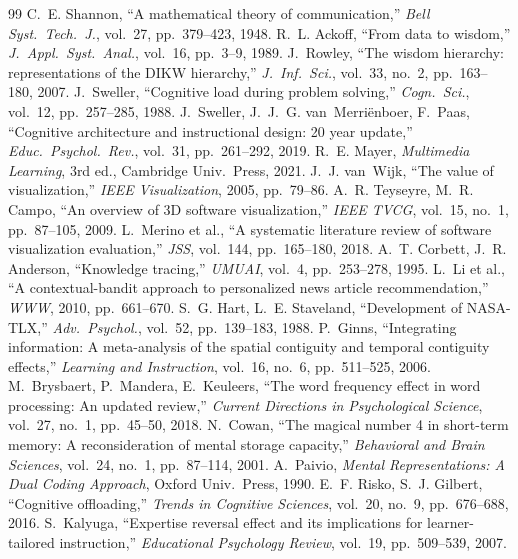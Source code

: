 \documentclass[10pt,a4paper]{article}
\begin{document}
\begin{thebibliography}{99}
\small
{} C.~E. Shannon, ``A mathematical theory of communication,'' \emph{Bell Syst.\ Tech.\ J.}, vol.~27, pp.~379--423, 1948.
 R.~L. Ackoff, ``From data to wisdom,'' \emph{J.\ Appl.\ Syst.\ Anal.}, vol.~16, pp.~3--9, 1989.
 J.~Rowley, ``The wisdom hierarchy: representations of the DIKW hierarchy,'' \emph{J.\ Inf.\ Sci.}, vol.~33, no.~2, pp.~163--180, 2007.
 J.~Sweller, ``Cognitive load during problem solving,'' \emph{Cogn.\ Sci.}, vol.~12, pp.~257--285, 1988.
 J.~Sweller, J.~J.~G. van~Merriënboer, F.~Paas, ``Cognitive architecture and instructional design: 20 year update,'' \emph{Educ.\ Psychol.\ Rev.}, vol.~31, pp.~261--292, 2019.
 R.~E. Mayer, \emph{Multimedia Learning}, 3rd ed., Cambridge Univ.\ Press, 2021.
 J.~J. van~Wijk, ``The value of visualization,'' \emph{IEEE Visualization}, 2005, pp.~79--86.
 A.~R. Teyseyre, M.~R. Campo, ``An overview of 3D software visualization,'' \emph{IEEE TVCG}, vol.~15, no.~1, pp.~87--105, 2009.
 L.~Merino et al., ``A systematic literature review of software visualization evaluation,'' \emph{JSS}, vol.~144, pp.~165--180, 2018.
 A.~T. Corbett, J.~R. Anderson, ``Knowledge tracing,'' \emph{UMUAI}, vol.~4, pp.~253--278, 1995.
 L.~Li et al., ``A contextual-bandit approach to personalized news article recommendation,'' \emph{WWW}, 2010, pp.~661--670.
 S.~G. Hart, L.~E. Staveland, ``Development of NASA-TLX,'' \emph{Adv.\ Psychol.}, vol.~52, pp.~139--183, 1988.
 P.~Ginns, ``Integrating information: A meta-analysis of the spatial contiguity and temporal contiguity effects,'' \emph{Learning and Instruction}, vol.~16, no.~6, pp.~511--525, 2006.
 M.~Brysbaert, P.~Mandera, E.~Keuleers, ``The word frequency effect in word processing: An updated review,'' \emph{Current Directions in Psychological Science}, vol.~27, no.~1, pp.~45--50, 2018.
 N.~Cowan, ``The magical number 4 in short-term memory: A reconsideration of mental storage capacity,'' \emph{Behavioral and Brain Sciences}, vol.~24, no.~1, pp.~87--114, 2001.
 A.~Paivio, \emph{Mental Representations: A Dual Coding Approach}, Oxford Univ.\ Press, 1990.
 E.~F. Risko, S.~J. Gilbert, ``Cognitive offloading,'' \emph{Trends in Cognitive Sciences}, vol.~20, no.~9, pp.~676--688, 2016.
 S.~Kalyuga, ``Expertise reversal effect and its implications for learner-tailored instruction,'' \emph{Educational Psychology Review}, vol.~19, pp.~509--539, 2007.
\end{thebibliography}
\end{document}
